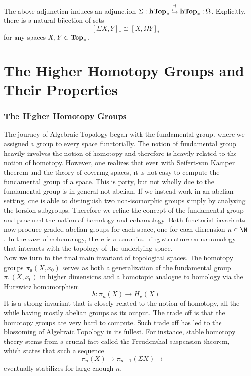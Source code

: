 \documentclass[a4paper]{article}
\begin{document}
\begin{crl}{}{}\\
The above adjunction induces an adjunction $\Sigma:\bold{hTop}_\ast\overset{\dashv}{\leftrightarrows}\bold{hTop}_\ast:\Omega$. Explicitly, there is a natural bijection of sets $$[\Sigma X,Y]_\ast\cong[X,\Omega Y]_\ast$$ for any spaces $X,Y\in\bold{Top}_\ast$. 
\end{crl}

\pagebreak
\part{The Higher Homotopy Groups and Their Properties}

\pagebreak
\section{The Higher Homotopy Groups}
The journey of Algebraic Topology began with the fundamental group, where we assigned a group to every space functorially. The notion of fundamental group heavily involves the notion of homotopy and therefore is heavily related to the notion of homotopy. However, one realizes that even with Seifert-van Kampen theorem and the theory of covering spaces, it is not easy to compute the fundamental group of a space. This is party, but not wholly due to the fundamental group is in general not abelian. If we instead work in an abelian setting, one is able to distinguish two non-isomorphic groups simply by analysing the torsion subgroups. Therefore we refine the concept of the fundamental group and procured the notion of homology and cohomology. Both functorial invariants now produce graded abelian groups for each space, one for each dimension $n\in\N$. In the case of cohomology, there is a canonical ring structure on cohomology that interacts with the topology of the underlying space. \\

Now we turn to the final main invariant of topological spaces. The homotopy groups $\pi_n(X,x_0)$ serves as both a generalization of the fundamental group $\pi_1(X,x_0)$ in higher dimensions and a homotopic analogue to homology via the Hurewicz homomorphism $$h:\pi_n(X)\to H_n(X)$$ It is a strong invariant that is closely related to the notion of homotopy, all the while having mostly abelian groups as its output. The trade off is that the homotopy groups are very hard to compute. Such trade off has led to the blossoming of Algebraic Topology in its fullest. For instance, stable homotopy theory stems from a crucial fact called the Freudenthal suspension theorem, which states that such a sequence $$\pi_n(X)\to\pi_{n+1}(\Sigma X)\to\cdots$$ eventually stabilizes for large enough $n$. \\
\end{document}
